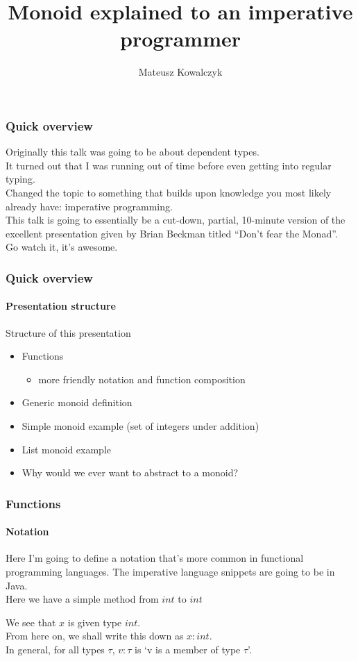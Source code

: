 \documentclass{beamer}
\title[Monoid explained]{Monoid explained to an imperative programmer}
\author{Mateusz Kowalczyk}
\institute{University of Bath}
\begin{document}
\begin{frame}
  \titlepage
\end{frame}
\begin{frame}
  \frametitle{Quick overview}
  Originally this talk was going to be about dependent types.\\
  \pause
  It turned out that I was running out of time before even getting
  into regular typing.\\
  \pause
  Changed the topic to something that builds upon knowledge you most
  likely already have: imperative programming.\\
  \pause
  This talk is going to essentially be a cut-down, partial, 10-minute
  version of the excellent presentation given by Brian Beckman titled
  ``Don't fear the Monad''.\\
  \pause
  Go watch it, it's awesome.
\end{frame}
\begin{frame}
  \frametitle{Quick overview}
  \framesubtitle{Presentation structure}
  Structure of this presentation
  \begin{itemize}[<+->]
    \item Functions
      \begin{itemize}
        \item more friendly notation and function composition
      \end{itemize}
    \item Generic monoid definition
    \item Simple monoid example (set of integers under addition)
    \item List monoid example
    \item Why would we ever want to abstract to a monoid?
  \end{itemize}
\end{frame}
\begin{frame}
  \frametitle{Functions}
  \framesubtitle{Notation}
  Here I'm going to define a notation that's more common in functional
  programming languages. The imperative language snippets are going to
  be in Java.\\
  Here we have a simple method from $int$ to $int$
  \pause
  
  \pause
  We see that $x$ is given type $int$.\\
  From here on, we shall write this down as $x:int$.\\
  \pause
  In general, for all types $\tau$, $v:\tau$ is `v is a member of type $\tau$'.
\end{frame}
\end{document}
